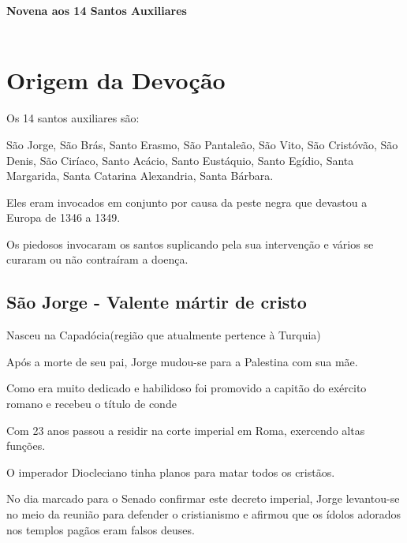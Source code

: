 \documentclass[a4paper,12pt]{extarticle} \usepackage[utf8]{inputenc}
\begin{document}
\begin{center}
  \textbf{\LARGE Novena aos 14 Santos Auxiliares}\\[0.5em]
  \\
\end{center}

\tableofcontents
\thispagestyle{empty}

\newpage

\section{Origem da Devoção}

Os 14 santos auxiliares são:

São Jorge, São Brás, Santo Erasmo, São Pantaleão, São Vito, São Cristóvão, São Denis, São Ciríaco, Santo Acácio, Santo Eustáquio, Santo Egídio, Santa Margarida, Santa Catarina Alexandria, Santa Bárbara.

Eles eram invocados em conjunto por causa da peste negra que devastou a Europa de 1346 a 1349.

Os piedosos invocaram os santos suplicando pela sua intervenção e vários se curaram ou não contraíram a doença.


\subsection{São Jorge -  Valente mártir de cristo} \label{são-jorge}

Nasceu na Capadócia(região que atualmente pertence à Turquia)

Após a morte de seu pai, Jorge mudou-se para a Palestina com sua mãe.

Como era muito dedicado e habilidoso foi promovido a capitão do exército romano e recebeu o título de conde

Com 23 anos passou a residir na corte imperial em Roma, exercendo altas funções.

O imperador Diocleciano tinha planos para matar todos os cristãos.

No dia marcado para o Senado confirmar este decreto imperial, Jorge levantou-se no meio da reunião para defender o cristianismo e afirmou que os ídolos adorados nos templos pagãos eram falsos deuses.
\end{document}
